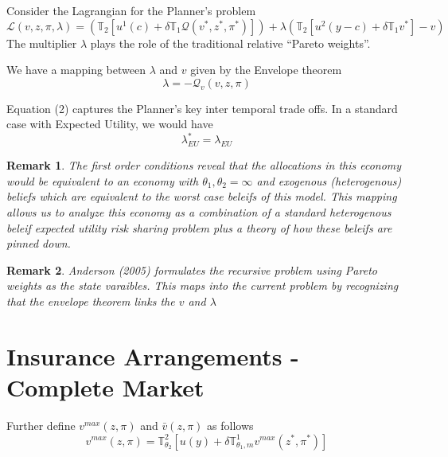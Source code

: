 \documentclass[12pt]{article}
\newtheorem{remark}{Remark}
\begin{document}
 
 
Consider the Lagrangian for the Planner's problem
\[\mathcal{L}(v,z,\pi,\lambda) = \left(\mathbb{T}_2\left[u^1(c)+\delta \mathbb{T}_1 \mathcal{Q}(v^*,z^*,\pi^*)\right]\right)+\lambda(\mathbb{T}_2\left[u^2(y-c)+\delta \mathbb{T}_1 v^*\right]-v)\]
The multiplier $\lambda$ plays the role of the traditional relative ``Pareto weights''. 

\noindent We have a mapping between $\lambda$ and $v$ given by the Envelope theorem
\[\lambda=-\mathcal{Q}_v(v,z,\pi)\]

\noindent Equation (2) captures the Planner's key inter temporal trade offs. In a standard case with Expected Utility, we would have 
\[\lambda_{EU}^*=\lambda_{EU}\]
\begin{remark}
The first order conditions reveal that the allocations in this economy would be equivalent to an economy with $\theta_1,\theta_2=\infty$ and exogenous (heterogenous) beliefs which are equivalent to the worst case beleifs of this model. This mapping allows us to analyze this economy as a combination of a standard heterogenous beleif expected utility risk sharing problem plus a theory of how these beleifs are pinned down. 
\end{remark}
\begin{remark}
Anderson (2005) formulates the recursive problem using Pareto weights as the state varaibles. This maps into the current problem by recognizing that the envelope theorem links the $v$ and $\lambda$
\end{remark}
\section{Insurance Arrangements  - Complete Market}




Further define $v^{max}(z,\pi)$ and $\bar{v}(z,\pi)$ as follows
\[v^{max}(z,\pi)=\mathbb{T}^2_{\theta_2}[u(y)+\delta \mathbb{T}^1_{\theta_1,m}v^{max}(z^*,\pi^*)]\]
\end{document}
